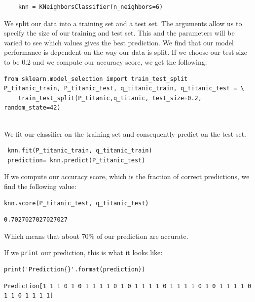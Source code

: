 \documentclass[11pt]{article}
\begin{document}
\begin{verbatim}
    knn = KNeighborsClassifier(n_neighbors=6)
\end{verbatim}

We split our data into a training set and a test set. The
arguments allow us to specify the size of our training and test set. This and
the parameters will be varied to see which values gives the best
prediction. We find that our model performance is dependent on the way our data is split. If we choose our test size to be 0.2 and we compute our accuracy score, we get the following:   


\begin{verbatim}
from sklearn.model_selection import train_test_split
P_titanic_train, P_titanic_test, q_titanic_train, q_titanic_test = \
    train_test_split(P_titanic,q_titanic, test_size=0.2, random_state=42)
 
\end{verbatim}

We fit our classifier on the training set and consequently predict on the test set.  

\begin{verbatim}
 knn.fit(P_titanic_train, q_titanic_train)
 prediction= knn.predict(P_titanic_test) 

\end{verbatim}

If we compute our accuracy score, which is the fraction of correct predictions, we find the following value:

\begin{verbatim}
knn.score(P_titanic_test, q_titanic_test)
\end{verbatim}

\begin{verbatim}
0.7027027027027027
\end{verbatim}

Which means that about 70\% of our prediction are accurate. 

If we \texttt{print} our prediction, this is what it looks like: 

\begin{verbatim}
print('Prediction{}'.format(prediction))
\end{verbatim}

\begin{verbatim}
Prediction[1 1 1 0 1 0 1 1 1 1 0 1 0 1 1 1 1 0 1 1 1 1 0 1 0 1 1 1 1 0 1 1 0 1 1 1 1]

\end{verbatim}
\end{document}
